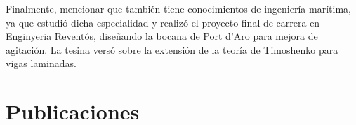 \documentclass[11pt]{article}
\begin{document}
Finalmente, mencionar que también tiene conocimientos de ingeniería marítima, ya que estudió dicha especialidad y realizó el proyecto final de carrera en Enginyeria Reventós, diseñando la bocana de Port d'Aro para mejora de agitación. La tesina versó sobre la extensión de la teoría de Timoshenko para vigas laminadas.







\section{Publicaciones}
\nocite{*}
\printbibliography[heading={subbibliography}, title={Artículos en revistas}, type=article]
\printbibliography[heading={subbibliography}, title={Tesis}, type=thesis]
\printbibliography[heading={subbibliography}, title={Presentaciones en congresos}, type=inproceedings]
\end{document}

